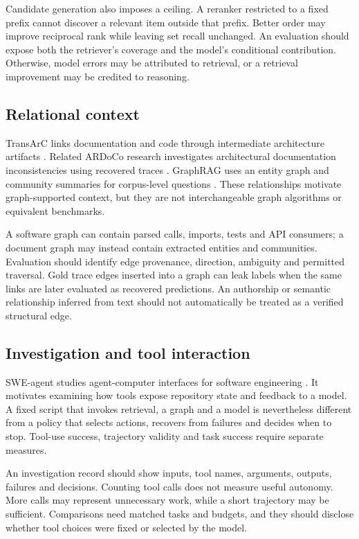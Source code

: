\documentclass[conference,a4paper]{IEEEtran}
\begin{document}
Candidate generation also imposes a ceiling. A reranker restricted to a fixed prefix cannot discover a relevant item outside that prefix. Better order may improve reciprocal rank while leaving set recall unchanged. An evaluation should expose both the retriever's coverage and the model's conditional contribution. Otherwise, model errors may be attributed to retrieval, or a retrieval improvement may be credited to reasoning.

\subsection{Relational context}
TransArC links documentation and code through intermediate architecture artifacts \cite{transarc}. Related ARDoCo research investigates architectural documentation inconsistencies using recovered traces \cite{ardoco}. GraphRAG uses an entity graph and community summaries for corpus-level questions \cite{graphrag}. These relationships motivate graph-supported context, but they are not interchangeable graph algorithms or equivalent benchmarks.

A software graph can contain parsed calls, imports, tests and API consumers; a document graph may instead contain extracted entities and communities. Evaluation should identify edge provenance, direction, ambiguity and permitted traversal. Gold trace edges inserted into a graph can leak labels when the same links are later evaluated as recovered predictions. An authorship or semantic relationship inferred from text should not automatically be treated as a verified structural edge.

\subsection{Investigation and tool interaction}
SWE-agent studies agent-computer interfaces for software engineering \cite{sweagent}. It motivates examining how tools expose repository state and feedback to a model. A fixed script that invokes retrieval, a graph and a model is nevertheless different from a policy that selects actions, recovers from failures and decides when to stop. Tool-use success, trajectory validity and task success require separate measures.

An investigation record should show inputs, tool names, arguments, outputs, failures and decisions. Counting tool calls does not measure useful autonomy. More calls may represent unnecessary work, while a short trajectory may be sufficient. Comparisons need matched tasks and budgets, and they should disclose whether tool choices were fixed or selected by the model.
\end{document}
